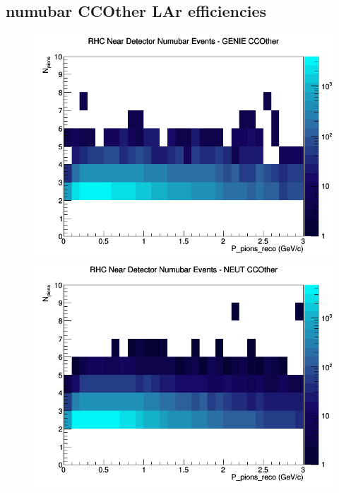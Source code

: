 \documentclass[12pt]{article}
\begin{document}
\subsection{numubar CCOther LAr efficiencies}
\begin{figure}[h]
\includegraphics[width=\linewidth]{eff_N_P/LAr/pions/CCOther_RHC_ND_numubar_N_P_GENIE.png}
\endminipage
{}
\includegraphics[width=\linewidth]{eff_N_P/LAr/pions/CCOther_RHC_ND_numubar_N_P_NEUT.png}
\endminipage
{}

\end{figure}
\end{document}
